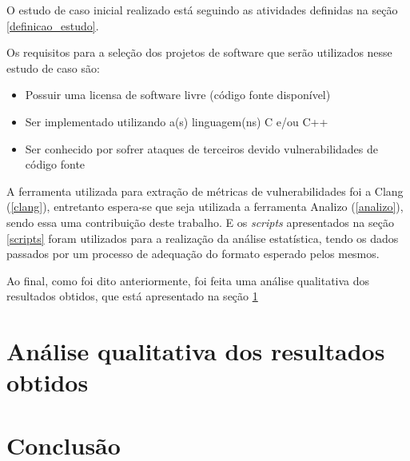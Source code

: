 O estudo de caso inicial realizado está seguindo as atividades definidas na seção \ref{definicao_estudo}.

Os requisitos para a seleção dos projetos de software que serão utilizados nesse estudo de caso são:

\begin{itemize}
  \item Possuir uma licensa de software livre (código fonte disponível)
  \item Ser implementado utilizando a(s) linguagem(ns) C e/ou C++
  \item Ser conhecido por sofrer ataques de terceiros devido vulnerabilidades de código fonte
\end{itemize}

A ferramenta utilizada para extração de métricas de vulnerabilidades foi a Clang (\ref{clang}), entretanto espera-se que seja utilizada
a ferramenta Analizo (\ref{analizo}), sendo essa uma contribuição deste trabalho. E os \textit{scripts} apresentados na seção 
\ref{scripts} foram utilizados para a realização da análise estatística, tendo os dados passados por um processo de adequação do 
formato esperado pelos mesmos.

Ao final, como foi dito anteriormente, foi feita uma análise qualitativa dos resultados obtidos, que está apresentado na seção
\ref{analise_estudo}

\section{Análise qualitativa dos resultados obtidos} \label{analise_estudo}

\section{Conclusão}
